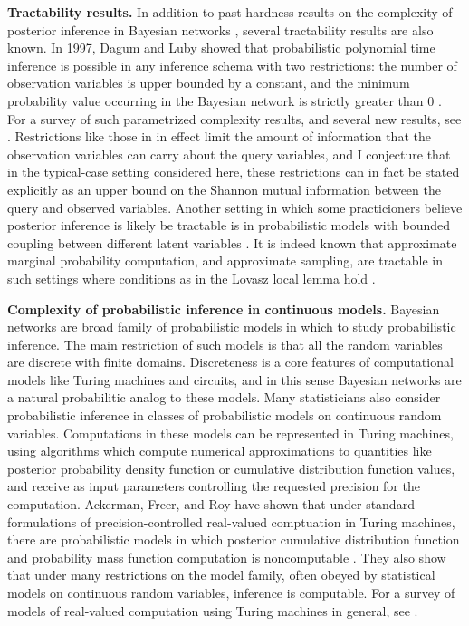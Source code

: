 \documentclass{article}
\theoremstyle{definition}
\theoremstyle{remark}
\begin{document}
\textbf{Tractability results.}
In addition to past hardness results on the complexity of posterior inference in Bayesian networks \cite{cooper1990,dagum1993}, several tractability results are also known.
In 1997, Dagum and Luby showed that probabilistic polynomial time inference is possible in any inference schema with two restrictions: the number of observation variables is upper bounded by a constant, and the minimum probability value occurring in the Bayesian network is strictly greater than $0$ \cite{dagum1997optimal}.
For a survey of such parametrized complexity results, and several new results, see \cite{kwisthout2018approximate}.
Restrictions like those in \cite{dagum1997optimal} in effect limit the amount of information that the observation variables can carry about the query variables,
and I conjecture that in the typical-case setting considered here, these restrictions can in fact be stated explicitly as an upper bound on the Shannon mutual information between the query and observed variables.
Another setting in which some practicioners believe posterior inference is likely be tractable is in probabilistic models with bounded coupling between different latent variables \cite{freer2010probabilistic}.
It is indeed known that approximate marginal probability computation, and approximate sampling, are tractable in such settings where conditions as in the Lovasz local lemma hold \cite{moitra2019approximate}.

\textbf{Complexity of probabilistic inference in continuous models.}
Bayesian networks are broad family of probabilistic models in which to study probabilistic inference.
The main restriction of such models is that all the random variables are discrete with finite domains.
Discreteness is a core features of computational models like Turing machines and circuits, and in this sense Bayesian networks are a natural probabilitic analog to these models.
Many statisticians also consider probabilistic inference in classes of probabilistic models on continuous random variables.
Computations in these models can be represented in Turing machines, using algorithms which compute numerical approximations to quantities like posterior probability density function or cumulative distribution function values, and receive as input parameters controlling the requested precision for the computation.
Ackerman, Freer, and Roy have shown that under standard formulations of precision-controlled real-valued comptuation in Turing machines,
there are probabilistic models in which posterior cumulative distribution function and probability mass function computation is noncomputable \cite{ackerman2019computability}.
They also show that under many restrictions on the model family, often obeyed by statistical models on continuous random variables, inference is computable.
For a survey of models of real-valued computation using Turing machines in general, see \cite{weihrauch2012computable}.
\end{document}
